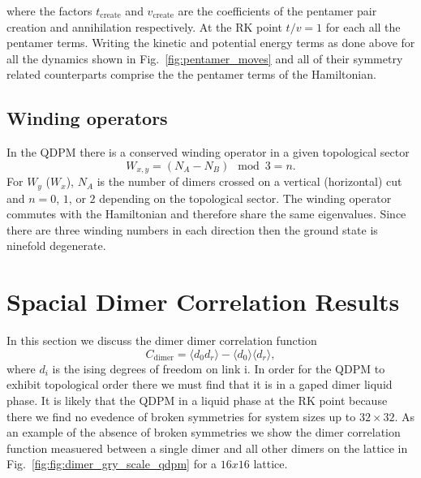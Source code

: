 \documentclass[twocolumn,prb,aps,floatfix,superscriptaddress]{revtex4-1}
\begin{document}
        where the factors $t_{\mathrm{create}}$ and $v_{\mathrm{create}}$ are the coefficients of
        the pentamer pair creation and annihilation respectively. At the RK point
        $t/v=1$ for each all the pentamer terms. 
        Writing the kinetic and potential energy terms as done above for all the dynamics shown in
        Fig.~\ref{fig:pentamer_moves} and all of their symmetry related counterparts comprise the
        the pentamer terms of the Hamiltonian. 

    \subsection{Winding operators}

        In the QDPM there is a conserved winding operator in a given topological sector
        \begin{equation}
            W_{x,y} = (N_A - N_B)\mod{3} = n
            .
        \end{equation}
        For $W_y$ ($W_x$), $N_A$ is the number of dimers crossed on a vertical (horizontal) cut and
        $n=0$, $1$, or $2$ depending on the topological sector. The winding operator commutes with
        the Hamiltonian and therefore share the same eigenvalues. Since there are three winding numbers in
        each direction then the ground state is ninefold degenerate.

\section{Spacial Dimer Correlation Results}
    
    In this section we discuss the dimer dimer correlation function
    \begin{equation}
        C_{\mathrm{dimer}} = \langle d_0 d_r \rangle - \langle d_0 \rangle   \langle d_r \rangle   
        ,
    \end{equation}
    where $d_i$ is the ising degrees of freedom on link i.
    In order for the QDPM to exhibit topological order there we must find that it is in a gaped
    dimer liquid phase. It is likely that the QDPM in a liquid phase at the RK point because there 
    we find no evedence of broken symmetries for system sizes up to $32\times32$. As an example of the
    absence of broken symmetries we show
    the dimer correlation function measuered between a single dimer and all other dimers on the
    lattice in Fig.~\ref{fig:fig:dimer_gry_scale_qdpm} for a $16x16$ lattice.
\end{document}
